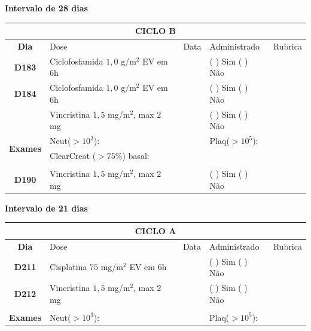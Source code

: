 \documentclass[11pt,a4paper,oldfontcommands]{memoir}
\begin{document}
\begin{center}
    \textbf{Intervalo de 28 dias}
    \begin{table}[H]
    \begin{tabular}{p{1cm}p{6cm}|p{1cm}|p{3cm}|p{2.5cm}}
    \hline
	\multicolumn{5}{c}{\textbf{CICLO B}}\\
	\hline
    \multicolumn{1}{c|}{\multirow{1}{*}{\textbf{Dia}}}&{Dose}&{Data}&{Administrado}&{Rubrica} \\
    \hline
    \multicolumn{1}{c|}{\multirow{1}{*}{\textbf{D183}}}&{Ciclofosfamida \(1,0\) g/m\(^2\) EV em 6h}&&{(  ) Sim (  ) Não}&\\
    \multicolumn{1}{c|}{\multirow{1}{*}{\textbf{D184}}}&{Ciclofosfamida \(1,0\) g/m\(^2\) EV em 6h}&&{(  ) Sim (  ) Não}&\\
    \multicolumn{1}{c|}{\multirow{1}{*}{\textbf{}}}&{Vincristina \(1,5\) mg/m\(^2\), max \(2\) mg}&&{(  ) Sim (  ) Não}&\\
    \hline
    \multicolumn{1}{c|}{\multirow{2}{*}{\textbf{Exames}}}&\multicolumn{2}{l|}{Neut(\(>10^3\)):}&{Plaq(\(>10^5\)):}&\\
    \cline{2-5}
    \multicolumn{1}{c|}{\multirow{2}{*}{{}}}&\multicolumn{2}{l|}{ClearCreat (\(>75\%\)) basal:}&{}&{}\\
    \hline
    \\
    \hline
    \multicolumn{1}{c|}{\multirow{1}{*}{\textbf{D190}}}&{Vincristina \(1,5\) mg/m\(^2\), max \(2\) mg}&&{(  ) Sim (  ) Não}&\\
    \hline
\end{tabular}
\end{table}
\textbf{Intervalo de 21 dias}
\begin{table}[H]
\begin{tabular}{p{1cm}p{6cm}|p{1cm}|p{3cm}|p{2.5cm}}
	\hline
	\multicolumn{5}{c}{\textbf{CICLO A}}\\
\hline
    \multicolumn{1}{c|}{\multirow{1}{*}{\textbf{Dia}}}&{Dose}&{Data}&{Administrado}&{Rubrica} \\
    \hline
    \multicolumn{1}{c|}{\multirow{1}{*}{\textbf{D211}}}&{Cisplatina \(75\) mg/m\(^2\) EV em 6h}&&{(  ) Sim (  ) Não}&\\
    \multicolumn{1}{c|}{\multirow{1}{*}{\textbf{D212}}}&{Vincristina \(1,5\) mg/m\(^2\), max \(2\) mg}&&{(  ) Sim (  ) Não}&\\
    \multicolumn{1}{c|}{\multirow{1}{*}{\textbf{}}}&&&&\\
    \hline
    \multicolumn{1}{c|}{\multirow{2}{*}{\textbf{Exames}}}&\multicolumn{2}{l|}{Neut(\(>10^3\)):}&{Plaq(\(>10^5\)):}&\\

\end{tabular}
\end{table}
\end{center}
\end{document}
